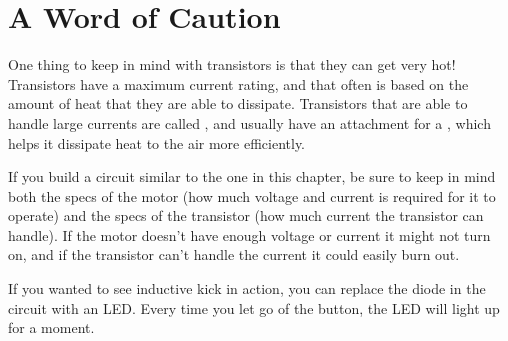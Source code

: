 \section{A Word of Caution}

One thing to keep in mind with transistors is that they can get very hot!
Transistors have a maximum current rating, and that often is based on the amount of heat that they are able to dissipate.
Transistors that are able to handle large currents are called , and usually have an attachment for a , which helps it dissipate heat to the air more efficiently.

If you build a circuit similar to the one in this chapter, be sure to keep in mind both the specs of the motor (how much voltage and current is required for it to operate) and the specs of the transistor (how much current the transistor can handle).
If the motor doesn't have enough voltage or current it might not turn on, and if the transistor can't handle the current it could easily burn out.

If you wanted to see inductive kick in action, you can replace the diode in the circuit with an LED.
Every time you let go of the button, the LED will light up for a moment.

\reviewsection

